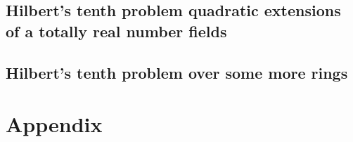 \documentclass[12pt,a4paper]{scrbook}
\numberwithin{equation}{section}
\begin{document}
\section{Hilbert's tenth problem quadratic extensions of a totally real number fields}


\section{Hilbert's tenth problem over some more rings}


\clearpage
\appendix
\chapter{Appendix}\label{sec:Appendix}


\backmatter
\vspace{\fill}
\printbibliography

\listoftodos
\end{document}
